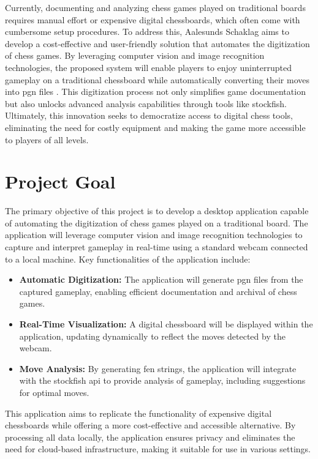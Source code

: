 Currently, documenting and analyzing chess games played on traditional boards requires manual effort or expensive digital chessboards, which often come with cumbersome setup procedures. To address this, Aalesunds Schaklag aims to develop a cost-effective and user-friendly solution that automates the digitization of chess games. By leveraging computer vision and image recognition technologies, the proposed system will enable players to enjoy uninterrupted gameplay on a traditional chessboard while automatically converting their moves into \gls{pgn} files \cite{ntnuopen:21}. This digitization process not only simplifies game documentation but also unlocks advanced analysis capabilities through tools like \gls{stockfish}. Ultimately, this innovation seeks to democratize access to digital chess tools, eliminating the need for costly equipment and making the game more accessible to players of all levels.

\section{Project Goal}

The primary objective of this project is to develop a desktop application capable of automating the digitization of chess games played on a traditional board. The application will leverage computer vision and image recognition technologies to capture and interpret gameplay in real-time using a standard webcam connected to a local machine. Key functionalities of the application include:

\begin{itemize}
    \item \textbf{Automatic Digitization:} The application will generate \gls{pgn} files from the captured gameplay, enabling efficient documentation and archival of chess games.

    \item \textbf{Real-Time Visualization:} A digital chessboard will be displayed within the application, updating dynamically to reflect the moves detected by the webcam.

    \item \textbf{Move Analysis:} By generating \gls{fen} strings, the application will integrate with the \gls{stockfish} \gls{api} to provide analysis of gameplay, including suggestions for optimal moves.
\end{itemize}

This application aims to replicate the functionality of expensive digital chessboards while offering a more cost-effective and accessible alternative. By processing all data locally, the application ensures privacy and eliminates the need for cloud-based infrastructure, making it suitable for use in various settings.

